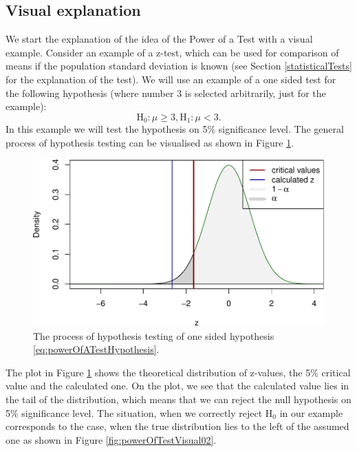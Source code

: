 \documentclass[
]{book}
\theoremstyle{definition}
\theoremstyle{definition}
\theoremstyle{definition}
\theoremstyle{definition}
\theoremstyle{remark}
\begin{document}
\subsection{Visual explanation}\label{visual-explanation}

We start the explanation of the idea of the Power of a Test with a visual example. Consider an example of a z-test, which can be used for comparison of means if the population standard deviation is known (see Section \ref{statisticalTests} for the explanation of the test). We will use an example of a one sided test for the following hypothesis (where number 3 is selected arbitrarily, just for the example):
\begin{equation}
    \mathrm{H}_0: \mu \geq 3, \mathrm{H}_1: \mu < 3.
    \label{eq:powerOfATestHypothesis}
\end{equation}
In this example we will test the hypothesis on 5\% significance level. The general process of hypothesis testing can be visualised as shown in Figure \ref{fig:powerOfTestVisual01}.

\begin{figure}
\centering
\includegraphics{Svetunkov---Statistics-for-Business-Analytics_files/figure-latex/powerOfTestVisual01-1.pdf}
\caption{\label{fig:powerOfTestVisual01}The process of hypothesis testing of one sided hypothesis \eqref{eq:powerOfATestHypothesis}.}
\end{figure}

The plot in Figure \ref{fig:powerOfTestVisual01} shows the theoretical distribution of z-values, the 5\% critical value and the calculated one. On the plot, we see that the calculated value lies in the tail of the distribution, which means that we can reject the null hypothesis on 5\% significance level. The situation, when we correctly reject H\(_0\) in our example corresponds to the case, when the true distribution lies to the left of the assumed one as shown in Figure \ref{fig:powerOfTestVisual02}.
\end{document}
